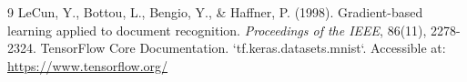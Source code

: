 \documentclass[12pt,a4paper]{article}
\begin{document}
\begin{thebibliography}{9}
LeCun, Y., Bottou, L., Bengio, Y., \& Haffner, P. (1998). Gradient-based learning applied to document recognition. \textit{Proceedings of the IEEE}, 86(11), 2278-2324.
TensorFlow Core Documentation. `tf.keras.datasets.mnist`. Accessible at: \url{https://www.tensorflow.org/}
\end{thebibliography}
\end{document}
